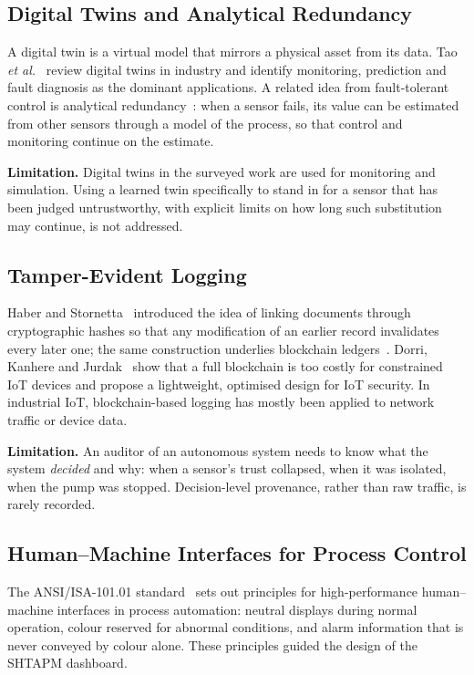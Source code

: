 \subsection{Digital Twins and Analytical Redundancy}

A digital twin is a virtual model that mirrors a physical asset from its data. Tao \emph{et al.}~\cite{tao2019twin} review digital twins in industry and identify monitoring, prediction and fault diagnosis as the dominant applications. A related idea from fault-tolerant control is analytical redundancy~\cite{chow1984redundancy}: when a sensor fails, its value can be estimated from other sensors through a model of the process, so that control and monitoring continue on the estimate.

\textbf{Limitation.} Digital twins in the surveyed work are used for monitoring and simulation. Using a learned twin specifically to stand in for a sensor that has been judged untrustworthy, with explicit limits on how long such substitution may continue, is not addressed.

\subsection{Tamper-Evident Logging}

Haber and Stornetta~\cite{haber1991timestamp} introduced the idea of linking documents through cryptographic hashes so that any modification of an earlier record invalidates every later one; the same construction underlies blockchain ledgers~\cite{nakamoto2008bitcoin}. Dorri, Kanhere and Jurdak~\cite{dorri2017optimized} show that a full blockchain is too costly for constrained IoT devices and propose a lightweight, optimised design for IoT security. In industrial IoT, blockchain-based logging has mostly been applied to network traffic or device data.

\textbf{Limitation.} An auditor of an autonomous system needs to know what the system \emph{decided} and why: when a sensor's trust collapsed, when it was isolated, when the pump was stopped. Decision-level provenance, rather than raw traffic, is rarely recorded.

\subsection{Human--Machine Interfaces for Process Control}

The ANSI/ISA-101.01 standard~\cite{isa101} sets out principles for high-performance human--machine interfaces in process automation: neutral displays during normal operation, colour reserved for abnormal conditions, and alarm information that is never conveyed by colour alone. These principles guided the design of the SHTAPM dashboard.

